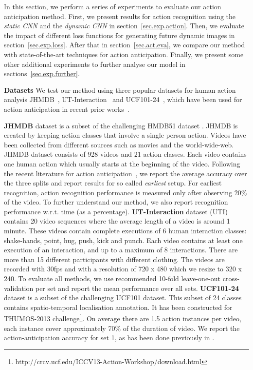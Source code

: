 In this section, we perform a series of experiments to evaluate our action anticipation method. First, we present results for action recognition using the \emph{static CNN} and the \emph{dynamic CNN} in section~\ref{sec.exp.action}. Then, we evaluate the impact of different loss functions for generating future dynamic images in section~\ref{sec.exp.loss}. After that in section~\ref{sec.act.eva}, we compare our method with state-of-the-art techniques for action anticipation. Finally, we present some other additional experiments to further analyse our model in sections~\ref{sec.exp.further}.


\textbf{Datasets} We test our method using three popular datasets for human action analysis JHMDB~\cite{jhuang2013towards}, UT-Interaction~\cite{UTInteractionData} and  UCF101-24~\cite{soomro2012ucf101}, which have been used for action anticipation in recent prior works~\cite{aliakbarian2017encouraging,soomro2016predicting,Singh2017}. %

\textbf{JHMDB} dataset is a subset of the challenging HMDB51 dataset \cite{kuehne2011hmdb}. JHMDB is created by keeping action classes that involve a single person action. Videos have been collected from different sources such as movies and the world-wide-web. JHMDB dataset consists of 928 videos and 21 action classes. Each video contains one human action which usually starts at the beginning of the video. Following the recent literature for action anticipation~\cite{aliakbarian2017encouraging}, we report the average accuracy over the three splits and report results for so called \emph{earliest} setup. For earliest recognition, action recognition performance is measured only after observing 20\% of the video. To further understand our method, we also report recognition performance w.r.t. time (as a percentage).
\textbf{UT-Interaction} dataset (UTI) contains 20 video sequences where the average length of a video is around 1 minute. These videos contain complete executions of 6 human interaction classes: shake-hands, point, hug, push, kick and punch. Each video contains at least one execution of an interaction, and up to a maximum of 8 interactions. There are more than 15 different participants with different clothing. The videos are recorded with 30fps and with a resolution of 720 x 480 which we resize to 320 x 240. To evaluate all methods, we use recommended 10-fold leave-one-out cross-validation per set and report the mean performance over all sets. 
\textbf{UCF101-24} dataset is a subset of the challenging UCF101 dataset. This subset of 24 classes contains spatio-temporal localisation annotation. It has been constructed for THUMOS-2013 challenge\footnote{http://crcv.ucf.edu/ICCV13-Action-Workshop/download.html}. On average there are 1.5 action instances per video, each instance cover approximately 70\% of the duration of video. We report the action-anticipation accuracy for set 1, as has been done previously in \cite{Singh2017}. 

